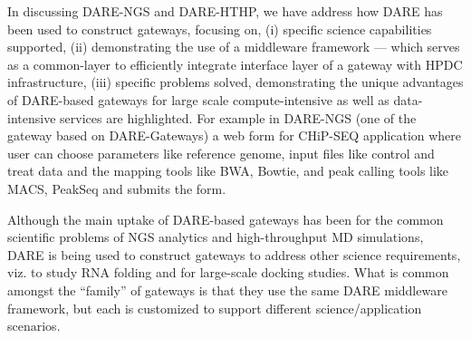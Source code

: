 \documentclass[]{svjour3}
\begin{document}

In discussing DARE-NGS and DARE-HTHP, we have address how DARE has
been used to construct gateways, focusing on, (i) specific science
capabilities supported, (ii) demonstrating the use of a middleware
framework --- which serves as a common-layer to efficiently integrate
interface layer of a gateway with HPDC infrastructure, (iii) specific
problems solved, demonstrating the unique advantages of DARE-based
gateways for large scale compute-intensive as well as data-intensive
services are highlighted.  For example in DARE-NGS (one of the gateway
based on DARE-Gateways) a web form for CHiP-SEQ application where user
can choose parameters like reference genome, input files like control
and treat data and the mapping tools like BWA, Bowtie, and peak
calling tools like MACS, PeakSeq and submits the form.

Although the main uptake of DARE-based gateways has been for the
common scientific problems of NGS analytics and high-throughput MD
simulations, DARE is being used to construct gateways to address other
science requirements, viz. to study RNA folding and for large-scale
docking studies.  What is common amongst the ``family'' of gateways is
that they use the same DARE middleware framework, but each is
customized to support different science/application scenarios.
\end{document}
